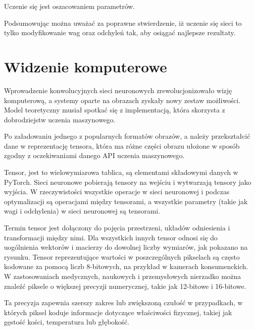 \documentclass[brudnopis]{xmgr}
\begin{document}
Uczenie się jest oszacowaniem parametrów.   

Podsumowując można uważać za  poprawne stwierdzenie, iż uczenie się sieci to tylko modyfikowanie wag oraz odchyleń tak, aby osiągać najlepsze rezultaty.


\chapter{Widzenie komputerowe  }


Wprowadzenie konwolucyjnych sieci neuronowych zrewolucjonizowało wizję komputerową, a systemy oparte na obrazach zyskały nowy zestaw możliwości. Model teoretyczny musiał spotkać się z implementacją, która skorzysta z dobrodziejstw uczenia maszynowego.

Po załadowaniu jednego  z popularnych formatów obrazów, a należy przekształcić dane w reprezentację tensora, która ma różne części obrazu ułożone w sposób zgodny z oczekiwaniami danego API uczenia maszynowego.


Tensor, jest to wielowymiarowa tablica, są elementami składowymi danych w PyTorch. Sieci neuronowe pobierają tensory na wejściu i wytwarzają tensory jako wyjścia. W rzeczywistości wszystkie operacje w sieci neuronowej i podczas optymalizacji są operacjami między tensorami, a wszystkie parametry (takie jak wagi i odchylenia) w sieci neuronowej są tensorami.

Termin tensor jest dołączony do pojęcia przestrzeni, układów odniesienia i transformacji między nimi. Dla wszystkich innych tensor odnosi się do uogólnienia wektorów i macierzy do dowolnej liczby wymiarów, jak pokazano na rysunku.
Tensor reprezentujące wartości w poszczególnych pikselach są często kodowane za pomocą liczb 8-bitowych, na przykład w kamerach konsumenckich. W zastosowaniach medycznych, naukowych i przemysłowych nierzadko można znaleźć piksele o większej precyzji numerycznej, takie jak 12-bitowe i 16-bitowe.

 Ta precyzja zapewnia szerszy zakres lub zwiększoną czułość w przypadkach, w których piksel koduje informacje dotyczące właściwości fizycznej, takiej jak gęstość kości, temperatura lub głębokość.
 
\end{document}
